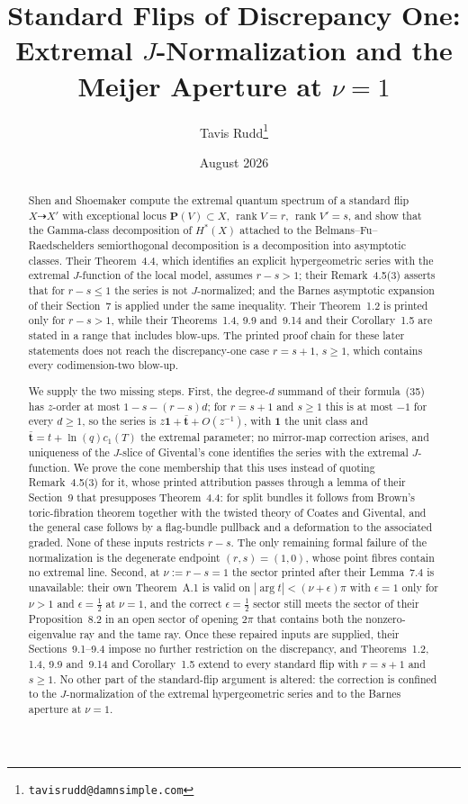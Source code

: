 \documentclass[11pt]{article}
\title{Standard Flips of Discrepancy One: Extremal \(J\)-Normalization
  and the Meijer Aperture at \(\nu=1\)}
\author{Tavis Rudd\thanks{\texttt{tavisrudd@damnsimple.com}}}
\date{August 2026}
\theoremstyle{definition}
\theoremstyle{remark}
\newcommand{\PP}{\mathbf P}
\newcommand{\one}{\mathbf 1}
\newcommand{\rk}{\operatorname{rank}}
\begin{document}
\maketitle

\begin{abstract}
Shen and Shoemaker compute the extremal quantum spectrum of a standard flip
\(X\dashrightarrow X'\) with exceptional locus \(\PP(V)\subset X\),
\(\rk V=r\), \(\rk V'=s\), and show that the Gamma-class decomposition of
\(H^{*}(X)\) attached to the Belmans--Fu--Raedschelders semiorthogonal
decomposition is a decomposition into asymptotic classes.  Their Theorem~4.4,
which identifies an explicit hypergeometric series with the extremal
\(J\)-function of the local model, assumes \(r-s>1\); their Remark~4.5(3)
asserts that for \(r-s\le1\) the series is not \(J\)-normalized; and the
Barnes asymptotic expansion of their Section~7 is applied under the same
inequality.  Their Theorem~1.2 is printed only for \(r-s>1\), while their
Theorems~1.4, 9.9 and~9.14 and their Corollary~1.5 are stated in a range that
includes blow-ups.  The printed proof chain for these later statements does
not reach the discrepancy-one case \(r=s+1\), \(s\ge1\), which contains every
codimension-two blow-up.

We supply the two missing steps.  First, the degree-\(d\) summand of their
formula~(35) has \(z\)-order at most \(1-s-(r-s)d\); for \(r=s+1\) and
\(s\ge1\) this is at most \(-1\) for every \(d\ge1\), so the series is
\(z\one+\bar{\mathbf t}+O(z^{-1})\), with \(\one\) the unit class and
\(\bar{\mathbf t}=t+\ln(q)c_{1}(T)\) the extremal parameter; no mirror-map
correction arises, and
uniqueness of the \(J\)-slice of Givental's cone identifies the series with
the extremal \(J\)-function.  We prove the cone membership that this uses
instead of quoting Remark~4.5(3) for it, whose printed attribution passes
through a lemma of their Section~9 that presupposes Theorem~4.4: for split
bundles it follows from
Brown's toric-fibration theorem together with the twisted theory of
Coates and Givental, and the general case follows by a flag-bundle pullback
and a deformation to the associated graded.  None of these inputs restricts
\(r-s\).  The only remaining formal failure of the normalization is the
degenerate endpoint \((r,s)=(1,0)\), whose point fibres contain
no extremal line.  Second, at \(\nu:=r-s=1\) the
sector printed after their Lemma~7.4 is unavailable: their own Theorem~A.1
is valid on \(|\arg t|<(\nu+\epsilon)\pi\) with \(\epsilon=1\) only for
\(\nu>1\) and \(\epsilon=\tfrac12\) at \(\nu=1\), and the correct
\(\epsilon=\tfrac12\)
sector still meets the sector of their Proposition~8.2 in an open sector of
opening \(2\pi\) that contains both the nonzero-eigenvalue ray and the tame
ray.  Once these repaired inputs are supplied, their Sections~9.1--9.4 impose
no further restriction on the discrepancy, and Theorems~1.2, 1.4, 9.9
and~9.14 and Corollary~1.5 extend to every standard flip with
\(r=s+1\) and \(s\ge1\).  No other part of the standard-flip argument is
altered: the correction is confined to the \(J\)-normalization of the extremal
hypergeometric series and to the Barnes aperture at \(\nu=1\).
\end{abstract}
\end{document}
